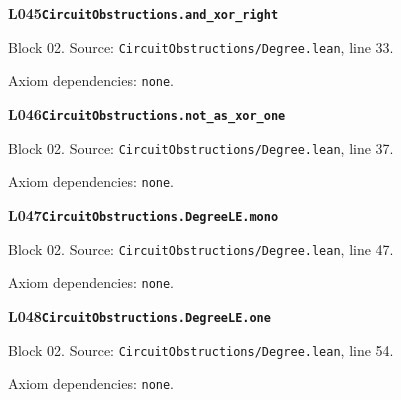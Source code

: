 \begin{minipage}{\linewidth}
\hypertarget{L045}{}
{\small\sffamily\bfseries\color{ink}L045\quad\nolinkurl{CircuitObstructions.and_xor_right}}\par
{\scriptsize\sffamily\color{muted}Block 02. Source: \nolinkurl{CircuitObstructions/Degree.lean}, line 33.}\par
{}
{\scriptsize\sffamily\color{muted}Axiom dependencies: \nolinkurl{none}.}
\end{minipage}\par\medskip
\begin{minipage}{\linewidth}
\hypertarget{L046}{}
{\small\sffamily\bfseries\color{ink}L046\quad\nolinkurl{CircuitObstructions.not_as_xor_one}}\par
{\scriptsize\sffamily\color{muted}Block 02. Source: \nolinkurl{CircuitObstructions/Degree.lean}, line 37.}\par
{}
{\scriptsize\sffamily\color{muted}Axiom dependencies: \nolinkurl{none}.}
\end{minipage}\par\medskip
\begin{minipage}{\linewidth}
\hypertarget{L047}{}
{\small\sffamily\bfseries\color{ink}L047\quad\nolinkurl{CircuitObstructions.DegreeLE.mono}}\par
{\scriptsize\sffamily\color{muted}Block 02. Source: \nolinkurl{CircuitObstructions/Degree.lean}, line 47.}\par
{}
{\scriptsize\sffamily\color{muted}Axiom dependencies: \nolinkurl{none}.}
\end{minipage}\par\medskip
\begin{minipage}{\linewidth}
\hypertarget{L048}{}
{\small\sffamily\bfseries\color{ink}L048\quad\nolinkurl{CircuitObstructions.DegreeLE.one}}\par
{\scriptsize\sffamily\color{muted}Block 02. Source: \nolinkurl{CircuitObstructions/Degree.lean}, line 54.}\par
{}
{\scriptsize\sffamily\color{muted}Axiom dependencies: \nolinkurl{none}.}
\end{minipage}\par\medskip
